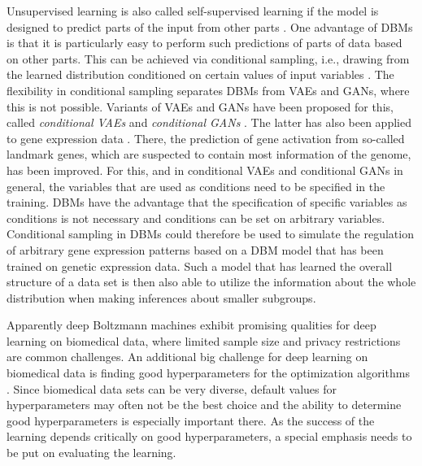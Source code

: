\documentclass[12pt]{article}
\begin{document}


Unsupervised learning is also called self-supervised learning if the model is designed to predict parts of the input from other parts \citep{lecun_selfsupervised_2019}.
One advantage of DBMs is that it is particularly easy to perform such predictions of parts of data based on other parts.
This can be achieved via conditional sampling, i.e., drawing from the learned distribution conditioned on certain values of input variables \citep{salakhutdinov2015generativemodels}.
The flexibility in conditional sampling separates DBMs from VAEs and GANs, where this is not possible.
Variants of VAEs and GANs have been proposed for this, called {\em conditional VAEs} \citep{cvae} and {\em conditional GANs} \citep{cgan}.
The latter has also been applied to gene expression data \citep{wang_conditional_2018}.
There, the prediction of gene activation from so-called landmark genes, which are suspected to contain most information of the genome, has been improved.
For this, and in conditional VAEs and conditional GANs in general, the variables that are used as conditions need to be specified in the training.
DBMs have the advantage that the specification of specific variables as conditions is not necessary and conditions can be set on arbitrary variables.
Conditional sampling in DBMs could therefore be used to simulate the regulation of arbitrary gene expression patterns based on a DBM model that has been trained on genetic expression data.
Such a model that has learned the overall structure of a data set is then also able to utilize the information about the whole distribution when making inferences about smaller subgroups.

Apparently deep Boltzmann machines exhibit promising qualities for deep learning on biomedical data, where limited sample size and privacy restrictions are common challenges.
An additional big challenge for deep learning on biomedical data is finding good hyperparameters for the optimization algorithms \citep{min_deep_2017}.
Since biomedical data sets can be very diverse, default values for hyperparameters may often not be the best choice and the ability to determine good hyperparameters is especially important there.
As the success of the learning depends critically on good hyperparameters, a special emphasis needs to be put on evaluating the learning.
\end{document}
